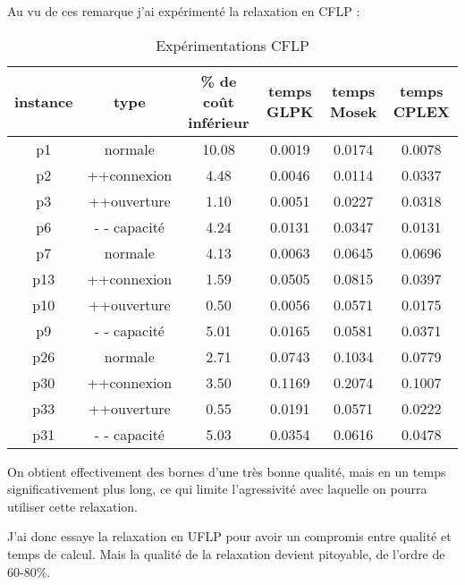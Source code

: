 \documentclass[12pt,a4paper]{article}
\begin{document}
Au vu de ces remarque j'ai expérimenté la relaxation en CFLP :
\begin{table}[!h]
\centering
\begin{tabular}{|c|c|c|c|c|c|}
  \hline
  instance & type & \% de coût inférieur & temps GLPK & temps Mosek & temps CPLEX \\
  \hline
	p1 & normale & 10.08 & 0.0019 & 0.0174 & 0.0078 \\
	p2 & ++connexion & 4.48 & 0.0046 & 0.0114 & 0.0337 \\
	p3 & ++ouverture & 1.10 & 0.0051 & 0.0227 & 0.0318 \\
	p6 & - - capacité & 4.24 & 0.0131 & 0.0347 & 0.0131 \\
  \hline
	p7 & normale & 4.13 & 0.0063 & 0.0645 & 0.0696 \\
	p13 & ++connexion & 1.59 & 0.0505 & 0.0815 & 0.0397 \\
	p10 & ++ouverture & 0.50 & 0.0056 & 0.0571 & 0.0175 \\
	p9 & - - capacité & 5.01 & 0.0165 & 0.0581 & 0.0371 \\
  \hline	
	p26 & normale & 2.71 & 0.0743 & 0.1034 & 0.0779 \\
	p30 & ++connexion & 3.50 & 0.1169 & 0.2074 & 0.1007 \\
	p33 & ++ouverture & 0.55 & 0.0191 & 0.0571 & 0.0222 \\
	p31 & - - capacité & 5.03 & 0.0354 & 0.0616 & 0.0478 \\
  \hline
\end{tabular}
\caption{Expérimentations CFLP}
\label{CFLP}
\end{table}

On obtient effectivement des bornes d'une très bonne qualité, mais en un temps significativement plus long, ce qui limite l’agressivité avec laquelle on pourra utiliser cette relaxation.

J'ai donc essaye la relaxation en UFLP pour avoir un compromis entre qualité et temps de calcul. Mais la qualité de la relaxation devient pitoyable, de l'ordre de 60-80\%.\\
\end{document}
